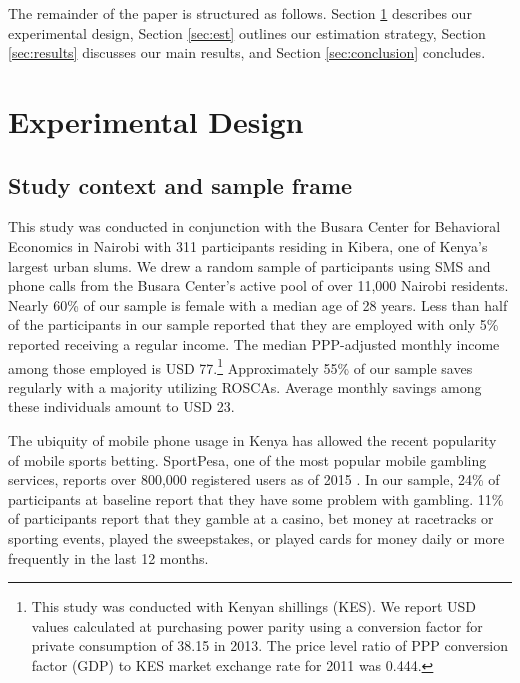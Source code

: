 \documentclass[11pt]{article}
\begin{document}

	The remainder of the paper is structured as follows. Section \ref{sec:design} describes our experimental design, Section \ref{sec:est} outlines our estimation strategy, Section \ref{sec:results} discusses our main results, and Section \ref{sec:conclusion} concludes.

\section{Experimental Design} \label{sec:design}

	\subsection{Study context and sample frame}

		This study was conducted in conjunction with the Busara Center for Behavioral Economics in Nairobi with 311 participants residing in Kibera, one of Kenya's largest urban slums. We drew a random sample of participants using SMS and phone calls from the Busara Center's active pool of over 11,000 Nairobi residents. Nearly 60\% of our sample is female with a median age of 28 years. Less than half of the participants in our sample reported that they are employed with only 5\% reported receiving a regular income. The median PPP-adjusted monthly income among those employed is USD 77.\footnote{This study was conducted with Kenyan shillings (KES). We report USD values calculated at purchasing power parity using a conversion factor for private consumption of 38.15 in 2013. The price level ratio of PPP conversion factor (GDP) to KES market exchange rate for 2011 was 0.444.} Approximately 55\% of our sample saves regularly with a majority utilizing ROSCAs. Average monthly savings among these individuals amount to USD 23. %

		The ubiquity of mobile phone usage in Kenya has allowed the recent popularity of mobile sports betting. SportPesa, one of the most popular mobile gambling services, reports over 800,000 registered users as of 2015 . In our sample, 24\% of participants at baseline report that they have some problem with gambling. 11\% of participants report that they gamble at a casino, bet money at racetracks or sporting events, played the sweepstakes, or played cards for money daily or more frequently in the last 12 months.

\end{document}
